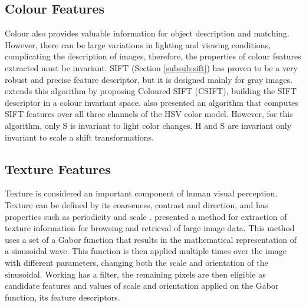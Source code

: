 \subsection{Colour Features}

Colour also provides valuable information for object description and matching. However, there can be large variations in lighting and viewing conditions, complicating the description of images, therefore, the properties of colour features extracted must be invariant.
SIFT (Section \ref{subsub:sift}) has proven to be a very robust and precise feature descriptor, but it is designed mainly for gray images. \citeauthor{abdel2006csift} \cite{abdel2006csift} extends this algorithm by proposing Coloured SIFT (CSIFT), building the SIFT descriptor in a colour invariant space.
\citeauthor{bosch2007representing} \cite{bosch2007representing} also presented an algorithm that computes SIFT features over all three channels of the HSV color model. However, for this algorithm, only S is invariant to light color changes. H and S are invariant only invariant to scale a shift transformations.

\subsection{Texture Features}

Texture is considered an important component of human visual perception. Texture can be defined by its coarseness, contrast and direction, and has properties such as periodicity and scale \cite{howarth2004evaluation}.
\citeauthor{manjunath1996texture} \cite{manjunath1996texture} presented a method for extraction of texture information for browsing and retrieval of large image data. This method uses a set of a Gabor function that results in the mathematical representation of a sinusoidal wave. This function is then applied multiple times over the image with different parameters, changing both the scale and orientation of the sinusoidal. Working has a filter, the remaining pixels are then eligible as candidate features and values of scale and orientation applied on the Gabor function, its feature descriptors.

